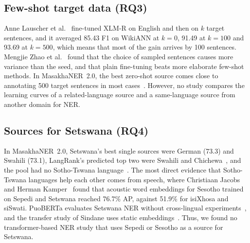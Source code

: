 \subsection{Few-shot target data (RQ3)}\label{sec:rw-rq3}
Anne Lauscher et al.~\cite{lauscher2020} fine-tuned XLM-R on English and then on $k$ target sentences, and it averaged 85.43 F1 on WikiANN at $k=0$, 91.49 at $k=100$ and 93.69 at $k=500$, which means that most of the gain arrives by 100 sentences. Mengjie Zhao et al.~\cite{zhao2021} found that the choice of sampled sentences causes more variance than the seed, and that plain fine-tuning beats more elaborate few-shot methods. In MasakhaNER~2.0, the best zero-shot source comes close to annotating 500 target sentences in most cases~\cite{adelani2022}. However, no study compares the learning curves of a related-language source and a same-language source from another domain for NER.

\subsection{Sources for Setswana (RQ4)}\label{sec:rw-rq4}
In MasakhaNER~2.0, Setswana's best single sources were German (73.3) and Swahili (73.1), LangRank's predicted top two were Swahili and Chichewa~\cite{lin2019}, and the pool had no Sotho-Tswana language~\cite{adelani2022}. The most direct evidence that Sotho-Tswana languages help each other comes from speech, where Christiaan Jacobs and Herman Kamper~\cite{jacobs2021} found that acoustic word embeddings for Sesotho trained on Sepedi and Setswana reached 76.7\% AP, against 51.9\% for isiXhosa and siSwati. PuoBERTa evaluates Setswana NER without cross-lingual experiments~\cite{marivate2023}, and the transfer study of Sindane uses static embeddings~\cite{sindane2023}. Thus, we found no transformer-based NER study that uses Sepedi or Sesotho as a source for Setswana.
